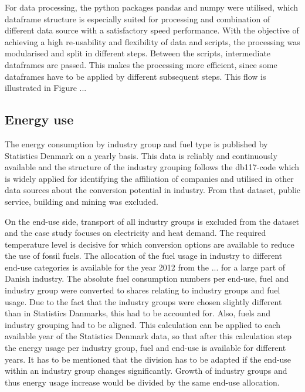 \documentclass[review]{elsarticle}
\begin{document}
For data processing, the python packages pandas and numpy were utilised, which dataframe structure is especially suited for processing and combination of different data source with a satisfactory speed performance. With the objective of achieving a high re-usability and flexibility of data and scripts, the processing was modularised and split in different steps. Between the scripts, intermediate dataframes are passed. This makes the processing more efficient, since some dataframes have to be applied by different subsequent steps. This flow is illustrated in Figure ...  


\subsection{Energy use}
The energy consumption by industry group and fuel type is published by Statistics Denmark on a yearly basis. This data is reliably and continuously available and the structure of the industry grouping follows the db117-code which is widely applied for identifying the affiliation of companies and utilised in other data sources about the conversion potential in industry. From that dataset, public service, building and mining was excluded.

On the end-use side, transport of all industry groups is excluded from the dataset and the case study focuses on electricity and heat demand. The required temperature level is decisive for which conversion options are available to reduce the use of fossil fuels. The allocation of the fuel usage in industry to different end-use categories is available for the year 2012 from the ... for a large part of Danish industry. The absolute fuel consumption numbers per end-use, fuel and industry group were converted to shares relating to industry groups and fuel usage. Due to the fact that the industry groups were chosen slightly different than in Statistics Danmarks, this had to be accounted for. Also, fuels and industry grouping had to be aligned. This calculation can be applied to each available year of the Statistics Denmark data, so that after this calculation step the energy usage per industry group, fuel and end-use is available for different years. It has to be mentioned that the division has to be adapted if the end-use within an industry group changes significantly. Growth of industry groups and thus energy usage increase would be divided by the same end-use allocation.
\end{document}
